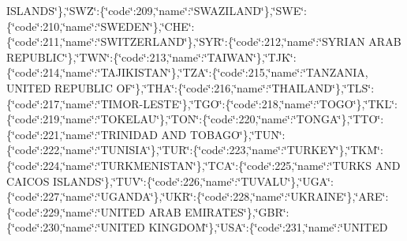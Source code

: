 {I\-S\-L\-A\-N\-D\-S\char`\"{}\},\char`\"{}S\-W\-Z\char`\"{}\-:\{\char`\"{}code\char`\"{}\-:209,\char`\"{}name\char`\"{}\-:\char`\"{}S\-W\-A\-Z\-I\-L\-A\-N\-D\char`\"{}\},\char`\"{}S\-W\-E\char`\"{}\-:\{\char`\"{}code\char`\"{}\-:210,\char`\"{}name\char`\"{}\-:\char`\"{}S\-W\-E\-D\-E\-N\char`\"{}\},\char`\"{}C\-H\-E\char`\"{}\-:\{\char`\"{}code\char`\"{}\-:211,\char`\"{}name\char`\"{}\-:\char`\"{}S\-W\-I\-T\-Z\-E\-R\-L\-A\-N\-D\char`\"{}\},\char`\"{}S\-Y\-R\char`\"{}\-:\{\char`\"{}code\char`\"{}\-:212,\char`\"{}name\char`\"{}\-:\char`\"{}S\-Y\-R\-I\-A\-N A\-R\-A\-B R\-E\-P\-U\-B\-L\-I\-C\char`\"{}\},\char`\"{}T\-W\-N\char`\"{}\-:\{\char`\"{}code\char`\"{}\-:213,\char`\"{}name\char`\"{}\-:\char`\"{}T\-A\-I\-W\-A\-N\char`\"{}\},\char`\"{}T\-J\-K\char`\"{}\-:\{\char`\"{}code\char`\"{}\-:214,\char`\"{}name\char`\"{}\-:\char`\"{}T\-A\-J\-I\-K\-I\-S\-T\-A\-N\char`\"{}\},\char`\"{}T\-Z\-A\char`\"{}\-:\{\char`\"{}code\char`\"{}\-:215,\char`\"{}name\char`\"{}\-:\char`\"{}T\-A\-N\-Z\-A\-N\-I\-A, U\-N\-I\-T\-E\-D R\-E\-P\-U\-B\-L\-I\-C O\-F\char`\"{}\},\char`\"{}T\-H\-A\char`\"{}\-:\{\char`\"{}code\char`\"{}\-:216,\char`\"{}name\char`\"{}\-:\char`\"{}T\-H\-A\-I\-L\-A\-N\-D\char`\"{}\},\char`\"{}T\-L\-S\char`\"{}\-:\{\char`\"{}code\char`\"{}\-:217,\char`\"{}name\char`\"{}\-:\char`\"{}T\-I\-M\-O\-R-\/L\-E\-S\-T\-E\char`\"{}\},\char`\"{}T\-G\-O\char`\"{}\-:\{\char`\"{}code\char`\"{}\-:218,\char`\"{}name\char`\"{}\-:\char`\"{}T\-O\-G\-O\char`\"{}\},\char`\"{}T\-K\-L\char`\"{}\-:\{\char`\"{}code\char`\"{}\-:219,\char`\"{}name\char`\"{}\-:\char`\"{}T\-O\-K\-E\-L\-A\-U\char`\"{}\},\char`\"{}T\-O\-N\char`\"{}\-:\{\char`\"{}code\char`\"{}\-:220,\char`\"{}name\char`\"{}\-:\char`\"{}T\-O\-N\-G\-A\char`\"{}\},\char`\"{}T\-T\-O\char`\"{}\-:\{\char`\"{}code\char`\"{}\-:221,\char`\"{}name\char`\"{}\-:\char`\"{}T\-R\-I\-N\-I\-D\-A\-D A\-N\-D T\-O\-B\-A\-G\-O\char`\"{}\},\char`\"{}T\-U\-N\char`\"{}\-:\{\char`\"{}code\char`\"{}\-:222,\char`\"{}name\char`\"{}\-:\char`\"{}T\-U\-N\-I\-S\-I\-A\char`\"{}\},\char`\"{}T\-U\-R\char`\"{}\-:\{\char`\"{}code\char`\"{}\-:223,\char`\"{}name\char`\"{}\-:\char`\"{}T\-U\-R\-K\-E\-Y\char`\"{}\},\char`\"{}T\-K\-M\char`\"{}\-:\{\char`\"{}code\char`\"{}\-:224,\char`\"{}name\char`\"{}\-:\char`\"{}T\-U\-R\-K\-M\-E\-N\-I\-S\-T\-A\-N\char`\"{}\},\char`\"{}T\-C\-A\char`\"{}\-:\{\char`\"{}code\char`\"{}\-:225,\char`\"{}name\char`\"{}\-:\char`\"{}T\-U\-R\-K\-S A\-N\-D C\-A\-I\-C\-O\-S I\-S\-L\-A\-N\-D\-S\char`\"{}\},\char`\"{}T\-U\-V\char`\"{}\-:\{\char`\"{}code\char`\"{}\-:226,\char`\"{}name\char`\"{}\-:\char`\"{}T\-U\-V\-A\-L\-U\char`\"{}\},\char`\"{}U\-G\-A\char`\"{}\-:\{\char`\"{}code\char`\"{}\-:227,\char`\"{}name\char`\"{}\-:\char`\"{}U\-G\-A\-N\-D\-A\char`\"{}\},\char`\"{}U\-K\-R\char`\"{}\-:\{\char`\"{}code\char`\"{}\-:228,\char`\"{}name\char`\"{}\-:\char`\"{}U\-K\-R\-A\-I\-N\-E\char`\"{}\},\char`\"{}A\-R\-E\char`\"{}\-:\{\char`\"{}code\char`\"{}\-:229,\char`\"{}name\char`\"{}\-:\char`\"{}U\-N\-I\-T\-E\-D A\-R\-A\-B E\-M\-I\-R\-A\-T\-E\-S\char`\"{}\},\char`\"{}G\-B\-R\char`\"{}\-:\{\char`\"{}code\char`\"{}\-:230,\char`\"{}name\char`\"{}\-:\char`\"{}U\-N\-I\-T\-E\-D K\-I\-N\-G\-D\-O\-M\char`\"{}\},\char`\"{}U\-S\-A\char`\"{}\-:\{\char`\"{}code\char`\"{}\-:231,\char`\"{}name\char`\"{}\-:\char`\"{}U\-N\-I\-T\-E\-D }
